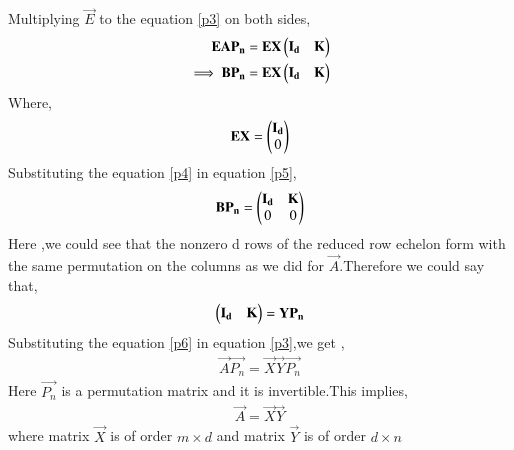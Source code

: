 \documentclass[journal,12pt,twocolumn]{IEEEtran}
\begin{document}
Multiplying $\vec{E}$ to the equation \eqref{p3} on both sides,
\begin{align}
    \mathbf{E}\mathbf{A}\mathbf{P_n}&=\mathbf{E}\mathbf{X}\begin{pmatrix}\mathbf{I_d}&\mathbf{K}\end{pmatrix}\\
    \implies \mathbf{B}\mathbf{P_n}&=\mathbf{E}\mathbf{X}\begin{pmatrix}\mathbf{I_d}&\mathbf{K}\end{pmatrix}\label{p5}
\end{align}
Where, 
\begin{align}
    \mathbf{E}\mathbf{X}=\begin{pmatrix}\mathbf{I_d}\\0\end{pmatrix}\label{p4}
\end{align}
Substituting the equation \eqref{p4} in equation \eqref{p5},
\begin{align}
    \mathbf{B}\mathbf{P_n}=\begin{pmatrix}\mathbf{I_d} & \mathbf{K} \\ 0 & 0\end{pmatrix}
\end{align}
Here ,we could see that the nonzero d rows of the reduced row echelon form with the same permutation on the columns as we did for $\vec{A}$.Therefore we could say that, 
\begin{align}
    \begin{pmatrix}\mathbf{I_d} & \mathbf{K}\end{pmatrix}=\mathbf{Y}\mathbf{P_n}\label{p6}
\end{align}
Substituting the equation \eqref{p6} in equation \eqref{p3},we get ,
\begin{align}
    \vec{A}\vec{P_n}=\vec{X}\vec{Y}\vec{P_n}
\end{align}
Here $\vec{P_n}$ is a permutation matrix and it is invertible.This implies,
\begin{align}
    \vec{A}=\vec{X}\vec{Y}
\end{align}
where matrix $\vec{X}$ is of order $m\times d$ and matrix $\vec{Y}$ is of order $d\times n$
\end{document}
